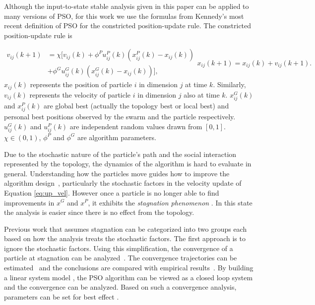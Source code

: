 \documentclass{sig-alternate}
\begin{document}
Although the input-to-state stable analysis given in this paper can be applied to many versions of PSO,
for this work we use the formulas from Kennedy's most recent definition of PSO\cite{4223164} for the constricted position-update rule.
The constricted position-update rule is

\begin{subequations}
\label{eq:pso_alg}
\begin{equation}
\label{eq:up_vel}
\begin{aligned}
v_{ij}(k+1) & = \chi [ v_{ij}(k) 
+ \phi^{P} u^{P}_{ij}(k) (x^{P}_{ij}(k) - x_{ij}(k))
\\ & + \phi^{G} u^{G}_{ij}(k) ( x^{G}_{ij}(k) - x_{ij}(k)) ],
\end{aligned}
\end{equation}
\begin{equation}
\label{eq:up_pos}
x_{ij}(k+1) = x_{ij}(k) + v_{ij}(k+1).
\end{equation}
\end{subequations}
$ x_{ij}(k) $ represents the position of particle $ i $ in dimension $ j $ at time $ k $.
Similarly, $ v_{ij}(k) $ represents the velocity of particle $ i $ in dimension $ j $ also at time $ k $.
$ x^{G}_{ij}(k) $ and $ x^{P}_{ij}(k) $ are global best (actually the topology best or local best) and personal best positions observed by the swarm and the particle respectively. 
$ u^{G}_{ij}(k) $ and $ u^{P}_{ij}(k) $ are independent random values drawn from $ [0,1] $.
$ \chi \in ( 0, 1 ) $, $ \phi^{P} $ and $ \phi^{G} $ are algorithm parameters.

Due to the stochastic nature of the particle's path and the social interaction represented by the topology, the dynamics of the algorithm is hard to evaluate in general.
Understanding how the particles move guides how to improve the algorithm design~\cite{bonyadi2014analysis}, particularly the stochastic factors in the velocity update of Equation \eqref{eq:up_vel}.
However once a particle is no longer able to find improvements in $ x^{G} $ and $ x^{P} $, it exhibits the \emph{stagnation phenomenon} \cite{Clerc06stagnationanalysis}.
In this state the analysis is easier since there is no effect from the topology.

Previous work that assumes stagnation can be categorized into two groups each based on how the analysis treats the stochastic factors.
The first approach is to ignore the stochastic factors.
Using this simplification, the convergence of a particle at stagnation can be analyzed~\cite{985692,cleghorn2014generalized}. 
The convergence trajectories can be estimated~\cite{vandenBergh2006937} and the conclusions are compared with empirical results~\cite{6900439}.
By building a linear system model \cite{4424687}, the PSO algorithm can be viewed as a closed loop system and the convergence can be analyzed.
Based on such a convergence analysis, parameters can be set for best effect \cite{Trelea2003317}.
\end{document}
